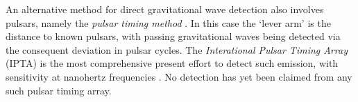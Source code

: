 An alternative method for direct gravitational wave detection also involves pulsars, namely the \emph{pulsar timing method} . In this case the `lever arm' is the distance to known pulsars, with passing gravitational waves being detected via the consequent deviation in pulsar cycles. The \emph{Interational Pulsar Timing Array} (IPTA) is the most comprehensive present effort to detect such emission, with sensitivity at nanohertz frequencies . No detection has yet been claimed from any such pulsar timing array.